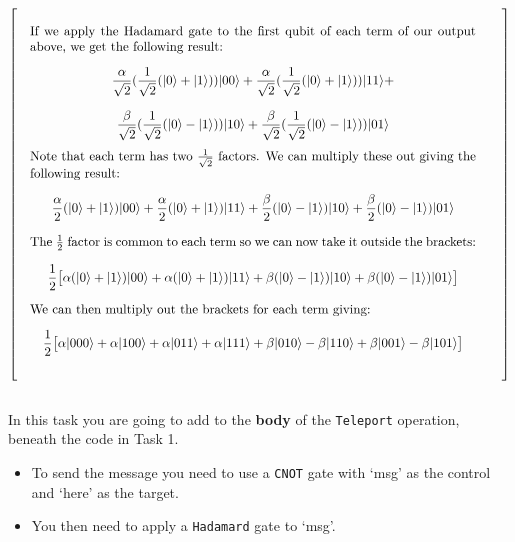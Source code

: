 \documentclass[a4paper]{article}
\begin{document}
\[
  \left[
      \begin{tabular}{@{\quad}m{\textwidth}@{\qquad}m{\textwidth}@{\quad}}
          \textbf{} \par
If we apply the Hadamard gate to the first qubit of each term of our output above, we get the following result:
$$ \frac{\alpha}{\sqrt{2}}(\frac{1}{\sqrt{2}}(|0\rangle + |1\rangle))|00\rangle + \frac{\alpha}{\sqrt{2}}(\frac{1}{\sqrt{2}}(|0\rangle + |1\rangle))|11\rangle + $$
$$ \frac{\beta}{\sqrt{2}}(\frac{1}{\sqrt{2}}(|0\rangle - |1\rangle))|10\rangle + \frac{\beta}{\sqrt{2}}(\frac{1}{\sqrt{2}}(|0\rangle - |1\rangle))|01\rangle $$
Note that each term has two $\frac{1}{\sqrt{2}}$ factors. We can multiply these out giving the following result:
$$ \frac{\alpha}{2}(|0\rangle + |1\rangle)|00\rangle + \frac{\alpha}{2}(|0\rangle + |1\rangle)|11\rangle + \frac{\beta}{2}(|0\rangle - |1\rangle)|10\rangle + \frac{\beta}{2}(|0\rangle - |1\rangle)|01\rangle $$
The $\frac{1}{2}$ factor is common to each term so we can now take it outside the brackets:
$$ \frac{1}{2}\big[\alpha(|0\rangle + |1\rangle)|00\rangle + \alpha(|0\rangle + |1\rangle)|11\rangle + \beta(|0\rangle - |1\rangle)|10\rangle + \beta(|0\rangle - |1\rangle)|01\rangle\big] $$
We can then multiply out the brackets for each term giving:
$$ \frac{1}{2}\big[\alpha|000\rangle + \alpha|100\rangle + \alpha|011\rangle + \alpha|111\rangle + \beta|010\rangle - \beta|110\rangle + \beta|001\rangle - \beta|101\rangle\big] $$
%
      \end{tabular}
    \right]
\]\\

In this task you are going to add to the \textbf{body} of the \verb$Teleport$ operation, beneath the code in Task 1.
\begin{itemize}
\item To send the message you need to use a \verb$CNOT$ gate with `msg' as the control and `here' as the target.
\item You then need to apply a \verb$Hadamard$ gate to `msg'.
\end{itemize}
\end{document}
